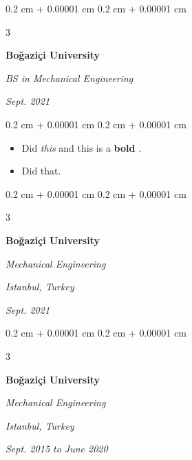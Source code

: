\documentclass[10pt, letterpaper]{article}
\newenvironment{highlights}{
    \begin{itemize}[
        topsep=0.10 cm,
        parsep=0.10 cm,
        partopsep=0pt,
        itemsep=0pt,
        leftmargin=0.4 cm + 10pt + 0.6 cm
    ]
}{
    \end{itemize}
} %
\newenvironment{onecolentry}{
    \begin{adjustwidth}{
        0.2 cm + 0.00001 cm
    }{
        0.2 cm + 0.00001 cm
    }
}{
    \end{adjustwidth}
} %
\newenvironment{threecolentry}[3][]{
    \onecolentry
    \def\thirdColumn{#3}
    \setcolumnwidth{0.6 cm, \fill, 4.5 cm}
    \begin{paracol}{3}
    #2 \switchcolumn
}{
    \switchcolumn \raggedleft \thirdColumn
    \end{paracol}
    \endonecolentry
} %
\let\hrefWithoutArrow\href
\renewcommand{\href}[2]{\hrefWithoutArrow{#1}{\mbox{\ifthenelse{\equal{#2}{}}{ }{#2 }\raisebox{.15ex}{\footnotesize \faExternalLink*}}}}
\begin{document}
        \vspace{0.2 cm-3px}

        \begin{threecolentry}{
            \vspace*{\fill}
            \textbullet
            \vspace*{3px}
            \vspace*{\fill}
        }{
            
            
        \textit{Sept. 2021}}
            \textbf{Boğaziçi University}

            \textit{BS in Mechanical Engineering}
        \end{threecolentry}

        \vspace{0.10 cm-3px}
        \begin{onecolentry}
            \begin{highlights}
                \item Did \textit{this} and this is a \textbf{bold} \href{https://example.com}{link}.
                \item Did that.
            \end{highlights}
        \end{onecolentry}


        \vspace{0.2 cm-3px}

        \begin{threecolentry}{
            \vspace*{\fill}
            \textbullet
            \vspace*{3px}
            \vspace*{\fill}
        }{
        \textit{Istanbul, Turkey}    
            
        \textit{Sept. 2021}}
            \textbf{Boğaziçi University}

            \textit{Mechanical Engineering}
        \end{threecolentry}



        \vspace{0.2 cm-3px}

        \begin{threecolentry}{
            \vspace*{\fill}
            \textbullet
            \vspace*{3px}
            \vspace*{\fill}
        }{
        \textit{Istanbul, Turkey}    
            
        \textit{Sept. 2015 to June 2020}}
            \textbf{Boğaziçi University}

            \textit{Mechanical Engineering}
        \end{threecolentry}
\end{document}
